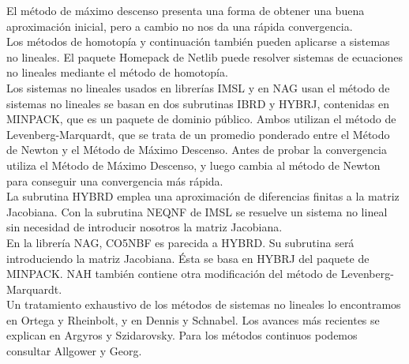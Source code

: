 El método de máximo descenso presenta una forma de obtener una buena aproximación inicial, pero a cambio no nos da una rápida convergencia. \\

Los métodos de homotopía y continuación también pueden aplicarse a sistemas no lineales. El paquete Homepack de Netlib puede resolver sistemas de ecuaciones no lineales mediante el método de homotopía. \\

Los sistemas no lineales usados en librerías IMSL y en NAG usan el método de sistemas no lineales se basan en dos subrutinas IBRD y HYBRJ, contenidas en MINPACK, que es un paquete de dominio público. Ambos utilizan el método de Levenberg-Marquardt, que se trata de un promedio ponderado entre el Método de Newton y el Método de Máximo Descenso. Antes de probar la convergencia utiliza el Método de Máximo Descenso, y luego cambia al método de Newton para conseguir una convergencia más rápida. \\

La subrutina HYBRD emplea una aproximación de diferencias finitas a la matriz Jacobiana. Con la subrutina NEQNF de IMSL se resuelve un sistema no lineal sin necesidad de introducir nosotros la matriz Jacobiana. \\

En la librería NAG, CO5NBF es parecida a HYBRD. Su subrutina será introduciendo la matriz Jacobiana. Ésta se basa en HYBRJ del paquete de MINPACK. NAH también contiene otra modificación del método de Levenberg-Marquardt.\\

Un tratamiento exhaustivo de los métodos de sistemas no lineales lo encontramos en Ortega y Rheinbolt, y en Dennis y Schnabel. Los avances más recientes se explican en Argyros y Szidarovsky. Para los métodos continuos podemos consultar Allgower y Georg.










